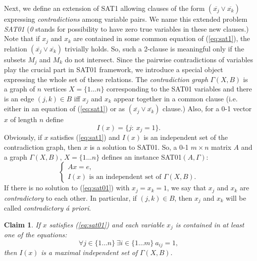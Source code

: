 \documentclass[11pt]{article}
\newtheorem{claim}{Claim}
\begin{document}
Next, we define an extension of SAT1 allowing clauses of the form $(\overline{x_j} \lor \overline{x_k})$ expressing {\em contradictions\/} among variable pairs. We name this extended problem {\em SAT01\/} ({\em 0\/} stands for possibility to have zero true variables in these new clauses.) Note that if $x_j$ and $x_k$ are contained in some common equation of (\ref{eq:sat1}), the relation $(\overline{x_j} \lor \overline{x_k})$ trivially holds. So, such a 2-clause is meaningful only if the subsets $M_j$ and $M_k$ do not intersect. Since the pairwise contradictions of variables play the crucial part in SAT01 framework, we introduce a special object expressing the whole set of these relations. The {\em contradiction graph} $\Gamma(X,B)$ is a graph of $n$ vertices $X=\{1 \ldots n\}$ corresponding to the SAT01 variables and there is an edge $(j,k) \in B$ iff $x_j$ and $x_k$ appear together in a common clause (i.e. either in an equation of (\ref{eq:sat1}) or as $(\overline{x_j} \lor \overline{x_k})$ clause.) Also, for a 0-1 vector $x$ of length $n$ define
\begin{equation}
\label{eq:isx}
I(x) = \{j: \ x_j=1\}.
\end{equation}
Obviously, if $x$ satisfies (\ref{eq:sat1}) and $I(x)$ is an independent set of the contradiction graph, then $x$ is a solution to SAT01. So, a 0-1 $m \times n$ matrix $A$ and a graph $\Gamma(X,B)$, $X=\{1 \ldots n\}$ defines an instance SAT01$(A,\Gamma)$:
\begin{equation}
\label{eq:sat01}
\left\{ \begin{array}{l}
Ax=e, \\
I(x) \textrm{ is an independent set of } \Gamma(X,B).
\end{array} \right.
\end{equation}
If there is no solution to (\ref{eq:sat01}) with $x_j=x_k=1$, we say that $x_j$ and $x_k$ are {\em contradictory\/} to each other. In particular, if $(j,k) \in B$, then $x_j$ and $x_k$ will be called {\em contradictory \'a priori\/}.
\begin{claim}
\label{claim:sat01mis}
If $x$ satisfies (\ref{eq:sat01}) and each variable $x_j$ is contained in at least one of the equations:
\begin{equation}
\label{eq:sat01mis}
\forall j \in \{1 \ldots n\} \ \exists i \in \{1 \ldots m\} \ a_{ij}=1,
\end{equation}
then $I(x)$ is a maximal independent set of $\Gamma(X,B)$.
\end{claim}
\end{document}
